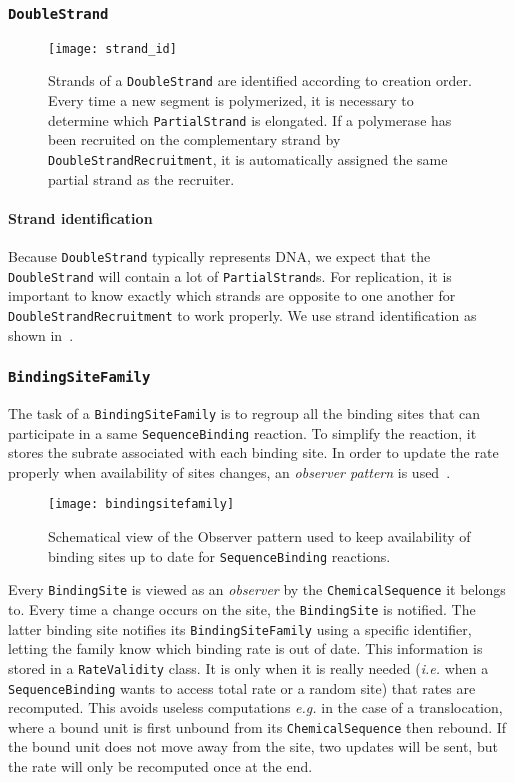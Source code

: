 \subsubsection{\texttt{DoubleStrand}}

\begin{figure}[!h]
  \centering
  \texttt{[image: strand\_id]}
  \caption{
  Strands of a \texttt{DoubleStrand} are identified according to creation order.
  Every time a new segment is polymerized,
  it is necessary to determine which \texttt{PartialStrand} is elongated.
  If a polymerase has been recruited on the complementary strand by \texttt{DoubleStrandRecruitment},
  it is automatically assigned the same partial strand as the recruiter.
  }
\label{fig:strand_id}
\end{figure}

\paragraph{Strand identification}
Because \texttt{DoubleStrand} typically represents DNA,
we expect that the \texttt{DoubleStrand} will contain a lot of \texttt{PartialStrand}s.
For replication, it is important to know exactly which strands are opposite
to one another for \texttt{DoubleStrandRecruitment} to work properly.
We use strand identification as shown in~.


\subsubsection{\texttt{BindingSiteFamily}}

The task of a \texttt{BindingSiteFamily} is to regroup all the binding sites
that can participate in a same \texttt{SequenceBinding} reaction.
To simplify the reaction, it stores the subrate associated with each binding site.
In order to update the rate properly when availability of sites changes,
an \emph{observer pattern} is used~.

\begin{figure}[!h]
  \centering
  \texttt{[image: bindingsitefamily]}
  \caption{Schematical view of the Observer pattern used to keep availability of
  binding sites up to date for \texttt{SequenceBinding} reactions.}
\label{fig:det_bsf}
\end{figure}

Every \texttt{BindingSite} is viewed as an \emph{observer} by the \texttt{ChemicalSequence} it belongs to.
Every time a change occurs on the site, the \texttt{BindingSite} is notified.
The latter binding site notifies its \texttt{BindingSiteFamily} using a specific identifier,
letting the family know which binding rate is out of date.
This information is stored in a \texttt{RateValidity} class.
It is only when it is really needed
(\textit{i.e.} when a \texttt{SequenceBinding} wants to access total rate or a random site)
that rates are recomputed.
This avoids useless computations \textit{e.g.} in the case of a translocation,
where a bound unit is first unbound from its \texttt{ChemicalSequence} then rebound.
If the bound unit does not move away from the site, two updates will be sent,
but the rate will only be recomputed once at the end.
